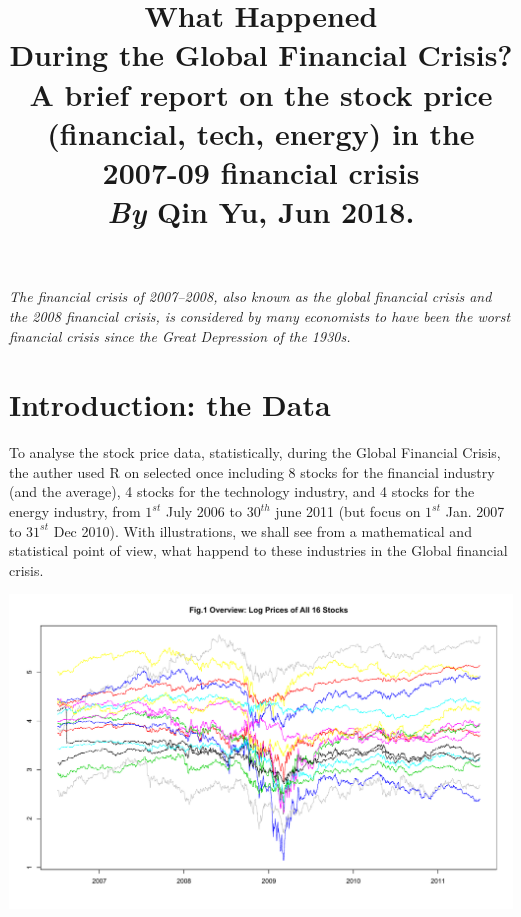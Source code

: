 \documentclass[11pt]{article}
\begin{document}
\title{
\vspace{-2em}
  \raggedright
  \textbf{What Happened \\During the Global Financial Crisis?} \\
  \vspace{0.3em}
  \large A brief report on the stock price (financial, tech, energy) in the 2007-09 financial crisis \\
  \vspace{1em}
  \textit{By} \textbf{Qin Yu}, Jun 2018. 
}
\date{}
\maketitle

\vspace{-5em}
\hspace{10em}
\parbox[position]{30em}{\textit{The financial crisis of 2007–2008, also known as the global financial crisis and the 2008 financial crisis, is considered by many economists to have been the worst financial crisis since the Great Depression of the 1930s.\cite{Wiki}}}


\section{Introduction: the Data}\vspace{-1em}
To analyse the stock price data, statistically, during the Global Financial Crisis, the auther used R on selected once including 8 stocks for the financial industry (and the average), 4 stocks for the technology industry, and 4 stocks for the energy industry, from $1^{st}$ July 2006 to $30^{th}$ june 2011 (but focus on $1^{st}$ Jan. 2007 to $31^{st}$ Dec 2010). With illustrations, we shall see from a mathematical and statistical point of view, what happend to these industries in the Global financial crisis.
\begin{center}
\includegraphics[width=1\linewidth]{graph/Fig1OverviewLogPricesOfAll16Stocks.pdf}
\end{center}
\end{document}
